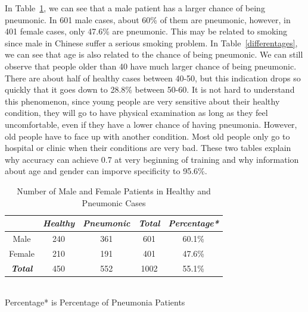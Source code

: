 In Table~\ref{malefemale}, we can see that a male patient has a larger chance of being pneumonic. In 601 male cases, about 60\% of them are pneumonic, however, in 401 female cases, only 47.6\% are pneumonic. This may be related to smoking since male in Chinese suffer a serious smoking problem. 
In Table~\ref{differentages}, we can see that age is also related to the chance of being pneumonic. We can still observe that people older than 40 have much larger chance of being pneumonic. There are about half of healthy cases between 40-50, but this indication drops so quickly that it goes down to 28.8\% between 50-60. It is not hard to understand this phenomenon, since young people are very sensitive about their healthy condition, they will go to have physical examination as long as they feel uncomfortable, even if they have a lower chance of having pneumonia. However, old people have to face up with another condition. Most old people only go to hospital or clinic when their conditions are very bad. These two tables explain why accuracy can achieve 0.7 at very beginning of training and why information about age and gender can imporve specificity to 95.6\%.


\begin{table}[htb]
    \vspace{-0cm}
    \caption{Number of Male and Female Patients in Healthy and Pneumonic Cases}
    \vspace{-0cm}
    \begin{center}
    \begin{tabular}{|c|c|c|c|c|}
    \hline
    \textbf{\textit{}} & \textbf{\textit{Healthy}} & \textbf{\textit{Pneumonic}}& \textbf{\textit{Total}}& \textbf{\textit{Percentage*}} \\
    \hline
    Male & 240 & 361 & 601 & 60.1\%\\
    Female & 210 & 191 & 401 &47.6\% \\
    \hline
    \textbf{\textit{Total}} & 450 & 552 & 1002 & 55.1\% \\
    
    \hline
    \end{tabular}
    \vspace{0.1cm}
    \label{malefemale} \\
    \footnotesize{Percentage* is Percentage of Pneumonia Patients}

    \end{center}

    \vspace{-0.0cm}
    \end{table}

